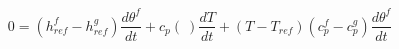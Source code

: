 \begin{equation}
0= (h_{ref}^f-h_{ref}^g) \frac{d\theta^f }{dt} + c_p(\ ) \frac{d T}{dt} +  (T- T_{ref}) (c_p^f-c_p^g) \frac{d\theta^f }{dt}
\end{equation}